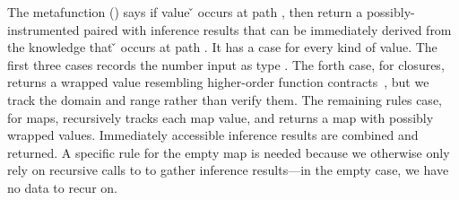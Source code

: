The metafunction \trackmeta{\v{}}{\inferpath{}}{\vp{}}{\res{}} ()
says if value \v{} occurs at path {\inferpath{}}, then return a possibly-instrumented
\vp{} paired with inference results {\res{}} that can be immediately derived
from the knowledge that \v{} occurs at path {\inferpath{}}.
It has a case for every kind of value.
The first three cases records the number input as type {\IntT{}}.
The forth case, for closures, returns a wrapped value
resembling higher-order function contracts~\cite{findler2002contracts},
but we track the domain and range rather than verify them.
The remaining rules case, for maps, recursively tracks each map value,
and returns a map with possibly wrapped values.
Immediately accessible inference results are combined
and returned.
A specific rule for the empty map is needed because we otherwise only rely on
recursive calls to \trackEOp{} to gather inference results---in the empty case,
we have no data to recur on.

